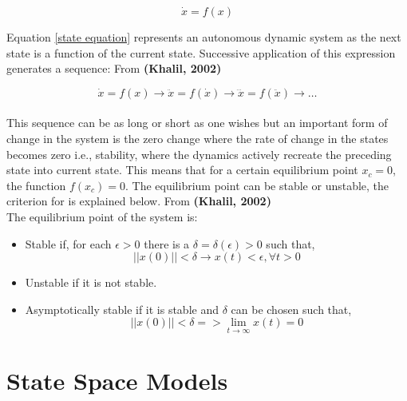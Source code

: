 \documentclass{UoNMCHA}
\numberwithin{equation}{section}
\begin{document}
	\begin{equation} \label{state equation}
	\dot{x} = f(x)
	\end{equation} 
	
	Equation \ref{state equation} represents an autonomous dynamic system as the next state is a function of the current state. Successive application of this expression generates a sequence: From \textbf{(Khalil, 2002)}
	
	\begin{equation} \label{arrows equation}
	\dot{x}=f\left(x\right)\rightarrow\ddot{x}=f\left(\dot{x}\right)\rightarrow\dddot{x}=f\left(\ddot{x}\right)\rightarrow\ldots
	\end{equation} \\
	
	This sequence can be as long or short as one wishes but an important form of change in the system is the zero change where the rate of change in the states becomes zero i.e., stability, where the dynamics actively recreate the preceding state into current state. This means that for a certain equilibrium point $x_{c}= 0$, the function $f(x_{c})=0$. The equilibrium point can be stable or unstable, the criterion for is explained below. From \textbf{(Khalil, 2002)} \\
	
	The equilibrium point of the system is: \\
	
	\begin{itemize}
		\item 	Stable if, for each $\epsilon>0$ there is a $\delta=\delta (\epsilon)>0$ such that,
		\begin{equation*}
		\left|\left|x\left(0\right)\right|\right|<\delta\rightarrow x(t)<\epsilon,\forall t>0  
		\end{equation*}
		\item Unstable if it is not stable.
		\item Asymptotically stable if it is stable and $\delta$ can be chosen such that,
		\begin{equation*}
		\left|\left|x\left(0\right)\right|\right|<\delta=>\lim_{t\to \infty}{x(t)=0}
		\end{equation*}
		
	\end{itemize}
	
	\section{State Space Models}\label{State Space Models}
	
\end{document}

